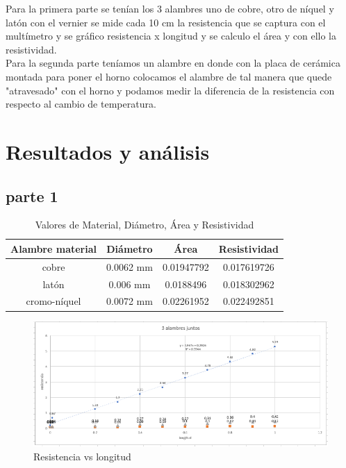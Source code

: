 \documentclass{article}
\begin{document}
\begin{multicols}{2}
Para la primera parte se tenían los 3 alambres uno de cobre, otro de níquel y latón con el vernier
se mide cada 10 cm la resistencia que se captura con el multímetro y se gráfico resistencia x longitud y se calculo 
el área y con ello la resistividad. 
\\
 Para la segunda parte teníamos un alambre en donde con la placa de cerámica montada para poner el horno colocamos 
 el alambre de tal manera que quede "atravesado" con el horno y podamos medir la diferencia de la resistencia con respecto al cambio de temperatura.
 \end{multicols}
\section{Resultados y análisis}\label{Resultados}			%
\subsection*{parte 1}
\begin{table}[H]
    \centering
    \begin{tabular}{|c|c|c|c|}
    \hline
    Alambre material & Diámetro & Área & Resistividad \\
    \hline
    cobre & 0.0062 mm & 0.01947792 & 0.017619726 \\
    latón & 0.006 mm & 0.0188496 & 0.018302962 \\
    cromo-níquel & 0.0072 mm & 0.02261952 & 0.022492851 \\
    \hline
    \end{tabular}
    \caption{Valores de Material, Diámetro, Área y Resistividad}
    \label{tabla:1}
\end{table}

\begin{figure}[H]
	\centering
	\includegraphics[scale=0.6]{../imgs/al.png}
	\caption{Resistencia vs longitud}
	\label{fig:1}
\end{figure}
\end{document}
